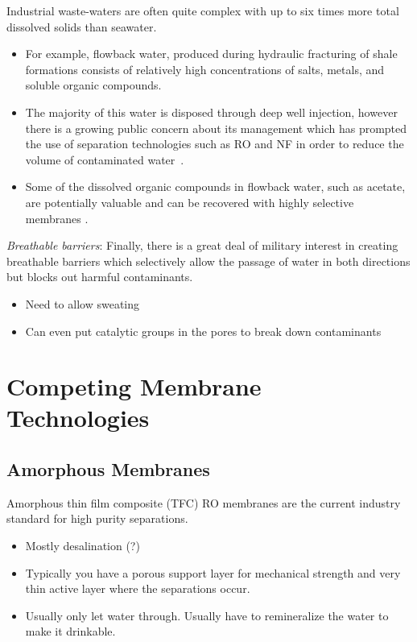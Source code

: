  Industrial waste-waters are often quite complex with up to six times more 
  total dissolved solids than seawater\cite{werber_materials_2016}. 
  \begin{itemize}
    \item For example, flowback water, produced during hydraulic fracturing of
    shale formations consists of relatively high concentrations of salts, metals,
    and soluble organic compounds. 
    \item The majority of this water is disposed through deep well injection, 
    however there is a growing public concern about its management which has 
    prompted the use of separation technologies such as RO and NF in order to 
    reduce the volume of contaminated water~\cite{gregory_water_2011}.
    \item Some of the dissolved organic compounds in flowback water, such as acetate, 
    are potentially valuable and can be recovered with highly selective membranes
    \cite{dischinger_application_2017}.
  \end{itemize}
  
  \textit{Breathable barriers}:
  Finally, there is a great deal of military interest in creating breathable 
  barriers which selectively allow the passage of water in both directions but
  blocks out harmful contaminants.
  \begin{itemize}
    \item Need to allow sweating
    \item Can even put catalytic groups in the pores to break down contaminants
  \end{itemize}

  \section{Competing Membrane Technologies}

  \subsection{Amorphous Membranes}
  
  Amorphous thin film composite (TFC) RO membranes are the current industry standard for
  high purity separations.
  \begin{itemize}  
    \item Mostly desalination (?)
    \item Typically you have a porous support layer for mechanical strength and 
    very thin active layer where the separations occur.
    \item Usually only let water through. Usually have to remineralize the
    water to make it drinkable.
  \end{itemize}
  
